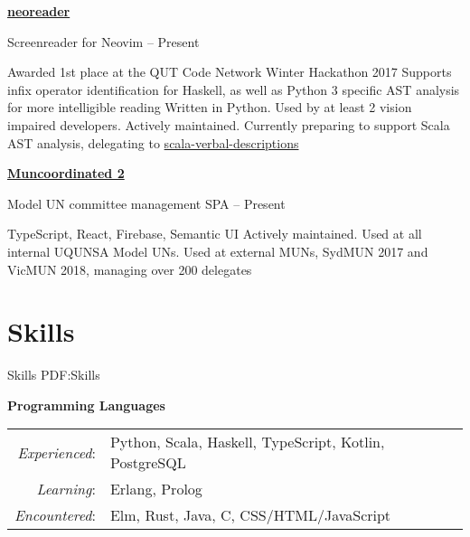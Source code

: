 \documentclass[a4paper,10pt,oneside]{article}
\begin{document}
\begin{body}
\href{https://github.com/MaxwellBo/neoreader}{\textbf{neoreader}} 
\par Screenreader for Neovim\hfill {} -- Present
\begin{detail}
	\BulletItem Awarded 1st place at the QUT Code Network Winter Hackathon 2017
	\BulletItem Supports infix operator identification for Haskell, as well as Python 3 specific AST analysis for more intelligible reading
	\BulletItem Written in Python. Used by at least 2 vision impaired developers. Actively maintained. Currently preparing to support Scala AST analysis, delegating to \href{https://github.com/MaxwellBo/scala-verbal-descriptions}{scala-verbal-descriptions}
\end{detail}


\EntryGap

\href{https://github.com/MaxwellBo/Muncoordinated-2}{\textbf{Muncoordinated 2}}
\par Model UN committee management SPA\hfill {} -- Present
\begin{detail}
	\BulletItem TypeScript, React, Firebase, Semantic UI
	\BulletItem Actively maintained. Used at all internal UQUNSA Model UNs. Used at external MUNs, SydMUN 2017 and VicMUN 2018, managing over 200 delegates
\end{detail}


\section
{Skills}
{Skills}
{PDF:Skills}

\textbf{Programming Languages}
\EntryGap
\EntryGap
\begin{tabular}{rl}
\par \textit{Experienced}: & Python, Scala, Haskell, TypeScript, Kotlin, PostgreSQL\\
\par \textit{Learning}: & Erlang, Prolog\\
\par \textit{Encountered}: & Elm, Rust, Java, C, CSS/HTML/JavaScript
\end{tabular}


\end{body}
\end{document}
